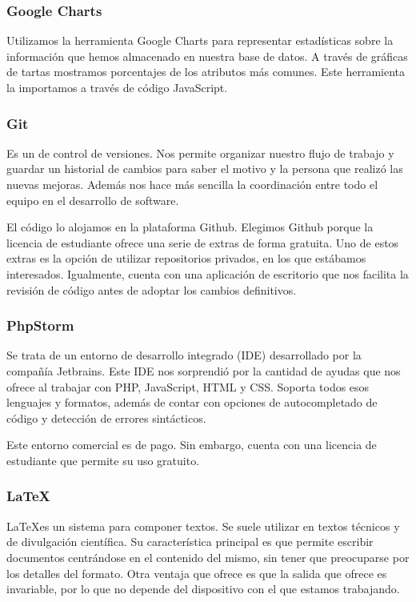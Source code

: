 \subsubsection{Google Charts}

Utilizamos la herramienta Google Charts \cite{GoogleCharts} para representar estadísticas sobre la información que hemos almacenado en nuestra base de datos. A través de gráficas de tartas mostramos porcentajes de los atributos más comunes. Este herramienta la importamos a través de código JavaScript. \par 

\subsubsection{Git}

Es un  de control de versiones. Nos permite organizar nuestro flujo de trabajo y guardar un historial de cambios para saber el motivo y la persona que realizó las nuevas mejoras. Además nos hace más sencilla la coordinación entre todo el equipo en el desarrollo de software. \par 

El código lo alojamos en la plataforma Github. Elegimos Github porque la licencia de estudiante ofrece una serie de extras de forma gratuita. Uno de estos extras es la opción de utilizar repositorios privados, en los que estábamos interesados. Igualmente, cuenta con una aplicación de escritorio que nos facilita la revisión de código antes de adoptar los cambios definitivos. \par 

\subsubsection{PhpStorm}

Se trata de un entorno de desarrollo integrado (IDE) desarrollado por la compañía Jetbrains. Este IDE nos sorprendió por la cantidad de ayudas que nos ofrece al trabajar con PHP, JavaScript, HTML y CSS. Soporta todos esos lenguajes y formatos, además de contar con opciones de autocompletado de código y detección de errores sintácticos. \par 

Este entorno comercial es de pago. Sin embargo, cuenta con una licencia de estudiante que permite su uso gratuito. \par 

\subsubsection{\LaTeX}
\LaTeX es un sistema para componer textos. Se suele utilizar en textos técnicos y de divulgación científica. Su característica principal es que permite escribir documentos centrándose en el contenido del mismo, sin tener que preocuparse por los detalles del formato. Otra ventaja que ofrece es que la salida que ofrece es invariable, por lo que no depende del dispositivo con el que estamos trabajando. \par 

